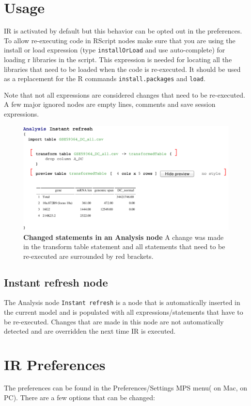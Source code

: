 \section{Usage}
IR is activated by default but this behavior can be opted out in the preferences.
To allow re-executing code in RScript nodes make sure that you are using
the install or load expression (type \texttt{installOrLoad} and use auto-complete) for loading
r libraries in the script. This expression is needed for locating all the libraries
that need to be loaded when the code is re-executed. It should be used as a
replacement for the R commands \texttt{install.packages} and \texttt{load}.
\begin{remark}
Note that not all expressions are considered changes that need to be re-executed. A few major ignored nodes are
empty lines, comments and save session expressions.
\begin{figure}[h!tbp]
  \centering
  \includegraphics[width=\figWidthWide]{figures/IRChangedStatements.pdf}
\caption[Changed statements in an Analysis node]{\textbf{Changed statements in an Analysis node} A change was made in the transform table statement and all statements that need to be re-executed are surrounded by red brackets.}
\end{figure}

\subsection{Instant refresh node}
The Analysis node \texttt{Instant refresh} is a node that is automatically inserted in the current model and is populated with all expressions/statements
that have to be re-executed. Changes that are made in this node are not automatically detected and are overridden the next time IR is executed.

\section{IR Preferences}
The preferences can be found in the Preferences/Settings MPS menu( on Mac,   on PC). \newline There are a few options that can be changed:


\end{remark}
